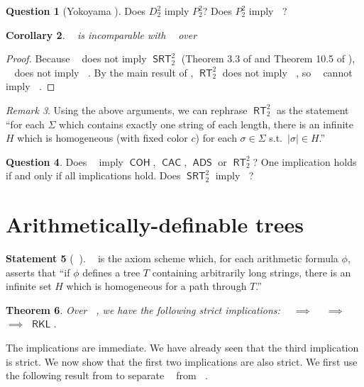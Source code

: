 \documentclass{amsart}
\theoremstyle{plain}
\newtheorem{theorem}{Theorem}
\newtheorem{corollary}[theorem]{Corollary}
\theoremstyle{remark}
\newtheorem{remark}[theorem]{Remark}
\theoremstyle{definition}
\newtheorem{question}[theorem]{Question}
\newtheorem{statement}[theorem]{Statement}
\DeclareMathOperator{\ACA}{\mathsf{ACA}_0}
\DeclareMathOperator{\RCA}{\mathsf{RCA}_0}
\DeclareMathOperator{\RT}{\mathsf{RT}}
\DeclareMathOperator{\SRT}{\mathsf{SRT}}
\DeclareMathOperator{\COH}{\mathsf{COH}}
\DeclareMathOperator{\CAC}{\mathsf{CAC}}
\DeclareMathOperator{\ADS}{\mathsf{ADS}}
\DeclareMathOperator{\WKL}{\mathsf{WKL}_0}
\DeclareMathOperator{\RKL}{\mathsf{RKL}}
\DeclareMathOperator{\RKLp}{\mathsf{RKL}^{(1)}}
\DeclareMathOperator{\RKLa}{\mathsf{RKL}^{(<\omega)}}
\newcommand{\Pt}{P^2_2}		%
\begin{document}
\begin{question}[Yokoyama \cite{yokoyama-rkl}]
Does $D^2_2$ imply $\Pt$? 
Does $\Pt$ imply $\RKLp$?
\end{question}


\begin{corollary}
$\RKLp$ is incomparable with $\WKL$ over $\RCA$
\end{corollary}
\begin{proof}
Because $\WKL$ does not imply $\SRT^2_2$ (Theorem 3.3 of \cite{seetapun} and Theorem 10.5 of \cite{CJS}), $\WKL$ does not imply $\RKLp$.
By the main result of \cite{liu}, $\RT^2_2$ does not imply $\WKL$, so $\RKLp$ cannot imply $\WKL$.
\end{proof}

\begin{remark}
Using the above arguments, we can rephrase $\RT^2_2$ as the statement 
``for each $\Sigma$ which contains exactly one string of each length, 
there is an infinite $H$ which is homogeneous (with fixed color $c$) for each $\sigma\in\Sigma$ s.t.\ $|\sigma|\in H$.''
\end{remark}


\begin{question}
Does $\RKLp$ imply $\COH$, $\CAC$, $\ADS$ or $\RT^2_2$?
One implication holds if and only if all implications hold.  Does $\SRT^2_2$ imply $\RKLp$?
\end{question}


\section{Arithmetically-definable trees}

\begin{statement}[$\RCA$]
$\RKLa$ is the axiom scheme which, for each arithmetic formula $\phi$, asserts that 
	``if $\phi$ defines a tree $T$ containing arbitrarily long strings, 
	there is an infinite set $H$ which is homogeneous for a path through $T$.''
\end{statement}


\begin{theorem} 
Over $\RCA$, we have the following strict implications:
$\ACA$ $\implies$ $\RKLa$ $\implies$ $\RKLp$ $\implies$ $\RKL$.
\end{theorem}

The implications are immediate.
We have already seen that the third implication is strict.  We now show that the first two implications are also strict.  We first use the following result from \cite{liu} to separate $\RKLa$ from $\ACA$.
\end{document}
